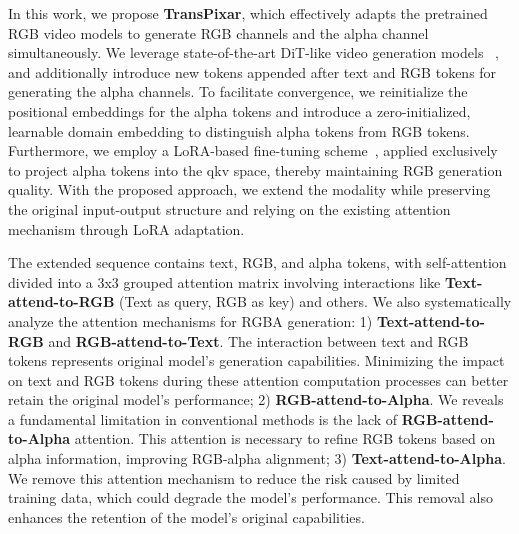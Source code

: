 In this work, we propose \textbf{TransPixar}, which effectively adapts the pretrained RGB video models to generate RGB channels and the alpha channel simultaneously. 
We leverage state-of-the-art DiT-like video generation models~\cite{yang2024cogvideox, opensoraplan} 
, and additionally introduce new tokens appended after text and RGB tokens %
for generating the alpha channels. 
%
To facilitate convergence, we reinitialize the positional embeddings for the alpha tokens and introduce a zero-initialized, learnable domain embedding to distinguish alpha tokens from RGB tokens. Furthermore, we employ a LoRA-based fine-tuning scheme~\cite{hu2021lora}, applied exclusively to project alpha tokens into the qkv space, thereby maintaining RGB generation quality.
With the proposed approach, we extend the modality while preserving the original input-output structure and relying on the existing attention mechanism through LoRA adaptation. 

The extended sequence contains text, RGB, and alpha tokens, with self-attention divided into a 3x3 grouped attention matrix involving interactions like \textbf{Text-attend-to-RGB} (Text as query, RGB as key) and others. 
We also systematically analyze the attention mechanisms for RGBA generation: 1) \textbf{Text-attend-to-RGB} and \textbf{RGB-attend-to-Text}. The interaction between text and RGB tokens represents original model's generation capabilities. Minimizing the impact on text and RGB tokens during these attention computation processes can better retain the original model's performance;
2) \textbf{RGB-attend-to-Alpha}. We reveals a fundamental limitation in conventional methods is the lack of \textbf{RGB-attend-to-Alpha} attention. This attention is necessary to refine RGB tokens based on alpha information, improving RGB-alpha alignment; 3) \textbf{Text-attend-to-Alpha}. We remove this attention mechanism to reduce the risk caused by limited training data, which could degrade the model's performance. This removal also enhances the retention of the model's original capabilities.

